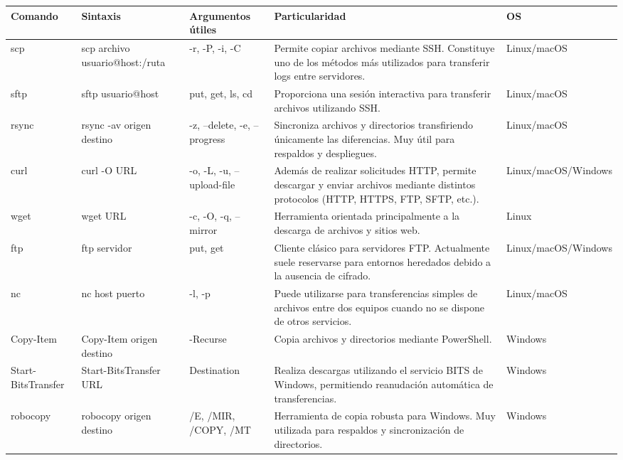 \documentclass[a4paper,10pt]{article}
\begin{document}
\begin{longtable}{|p{2.8cm}|p{3.3cm}|p{4cm}|p{5.3cm}|p{1.5cm}|}

\hline
Comando &
Sintaxis &
Argumentos útiles &
Particularidad &
OS
\\
\hline
\endhead

scp &
scp archivo usuario@host:/ruta &
-r, -P, -i, -C &
Permite copiar archivos mediante SSH. Constituye uno de los métodos más utilizados para transferir logs entre servidores. &
Linux/macOS
\\
\hline

sftp &
sftp usuario@host &
put, get, ls, cd &
Proporciona una sesión interactiva para transferir archivos utilizando SSH. &
Linux/macOS
\\
\hline

rsync &
rsync -av origen destino &
-z, --delete, -e, --progress &
Sincroniza archivos y directorios transfiriendo únicamente las diferencias. Muy útil para respaldos y despliegues. &
Linux/macOS
\\
\hline

curl &
curl -O URL &
-o, -L, -u, --upload-file &
Además de realizar solicitudes HTTP, permite descargar y enviar archivos mediante distintos protocolos (HTTP, HTTPS, FTP, SFTP, etc.). &
Linux/macOS/Windows
\\
\hline

wget &
wget URL &
-c, -O, -q, --mirror &
Herramienta orientada principalmente a la descarga de archivos y sitios web. &
Linux
\\
\hline

ftp &
ftp servidor &
put, get &
Cliente clásico para servidores FTP. Actualmente suele reservarse para entornos heredados debido a la ausencia de cifrado. &
Linux/macOS/Windows
\\
\hline

nc &
nc host puerto &
-l, -p &
Puede utilizarse para transferencias simples de archivos entre dos equipos cuando no se dispone de otros servicios. &
Linux/macOS
\\
\hline

Copy-Item &
Copy-Item origen destino &
-Recurse &
Copia archivos y directorios mediante PowerShell. &
Windows
\\
\hline

Start-BitsTransfer &
Start-BitsTransfer URL &
Destination &
Realiza descargas utilizando el servicio BITS de Windows, permitiendo reanudación automática de transferencias. &
Windows
\\
\hline

robocopy &
robocopy origen destino &
/E, /MIR, /COPY, /MT &
Herramienta de copia robusta para Windows. Muy utilizada para respaldos y sincronización de directorios. &
Windows
\\
\hline

\end{longtable}
\end{document}
